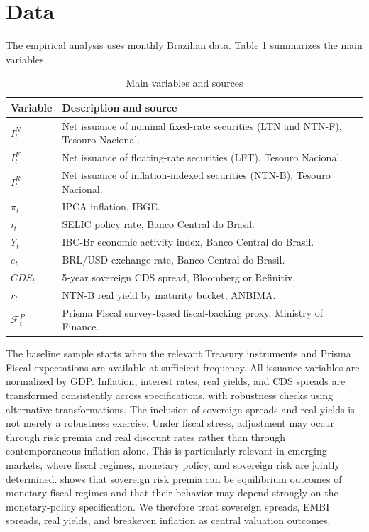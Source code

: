 \documentclass[12pt,a4paper]{article}
\begin{document}
\section{Data}
\label{sec:data}

The empirical analysis uses monthly Brazilian data. Table \ref{tab:variables} summarizes the main variables.

\begin{table}[h!]
\centering
\caption{Main variables and sources}
\label{tab:variables}
\begin{tabularx}{\textwidth}{lX}
\toprule
Variable & Description and source \\
\midrule
\(I_t^N\) & Net issuance of nominal fixed-rate securities (LTN and NTN-F), Tesouro Nacional. \\
\(I_t^F\) & Net issuance of floating-rate securities (LFT), Tesouro Nacional. \\
\(I_t^R\) & Net issuance of inflation-indexed securities (NTN-B), Tesouro Nacional. \\
\(\pi_t\) & IPCA inflation, IBGE. \\
\(i_t\) & SELIC policy rate, Banco Central do Brasil. \\
\(Y_t\) & IBC-Br economic activity index, Banco Central do Brasil. \\
\(e_t\) & BRL/USD exchange rate, Banco Central do Brasil. \\
\(CDS_t\) & 5-year sovereign CDS spread, Bloomberg or Refinitiv. \\
\(r_t\) & NTN-B real yield by maturity bucket, ANBIMA. \\
\(\mathcal{F}_t^P\) & Prisma Fiscal survey-based fiscal-backing proxy, Ministry of Finance. \\
\bottomrule
\end{tabularx}
\end{table}

The baseline sample starts when the relevant Treasury instruments and Prisma Fiscal expectations are available at sufficient frequency. All issuance variables are normalized by GDP. Inflation, interest rates, real yields, and CDS spreads are transformed consistently across specifications, with robustness checks using alternative transformations. The inclusion of sovereign spreads and real yields is not merely a robustness exercise. Under fiscal stress, adjustment may occur through risk premia and real discount rates rather than through contemporaneous inflation alone. This is particularly relevant in emerging markets, where fiscal regimes, monetary policy, and sovereign risk are jointly determined. \citet{Uribe2006} shows that sovereign risk premia can be equilibrium outcomes of monetary-fiscal regimes and that their behavior may depend strongly on the monetary-policy specification. We therefore treat sovereign spreads, EMBI spreads, real yields, and breakeven inflation as central valuation outcomes.
\end{document}
